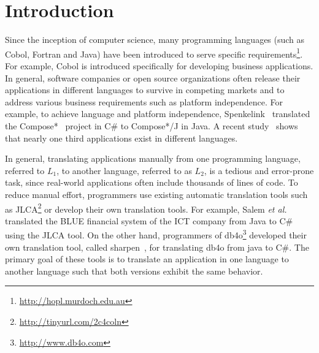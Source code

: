 \section{Introduction}
\label{sec:introduction}

Since the inception of computer science, many programming languages (such as Cobol, Fortran and Java) have been introduced to serve specific requirements\footnote{\url{http://hopl.murdoch.edu.au}}. For example, Cobol is introduced specifically for developing business applications. In general, software companies or open source organizations often release their applications in different languages to survive in competing markets and to address various business requirements such as platform independence. For example, to achieve language and platform independence, Spenkelink~\cite{spenkelink2007porting} translated the Compose*~\cite{garcia-compose} project in C\# to Compose*/J in Java. A recent study~\cite{jones1998estimating} shows that nearly one third applications exist in different languages. 

In general, translating applications manually from one programming language, referred to $L_1$, to another language, referred to as $L_2$, is a tedious and error-prone task, since real-world applications often include thousands of lines of code. To reduce manual effort, programmers use existing automatic translation tools such as JLCA\footnote{\url{http://tinyurl.com/2c4coln}} or develop their own translation tools. For example, Salem \emph{et al.}~\cite{AgtashAEMBS06} translated the BLUE financial system of the ICT company from Java to C\# using the JLCA tool. On the other hand, programmers of db4o\footnote{\url{http://www.db4o.com}} developed their own translation tool, called sharpen~\cite{Sharpen}, for translating db4o from java to C\#. The primary goal of these tools is to translate an application in one language to another language such that both versions exhibit the same behavior.


